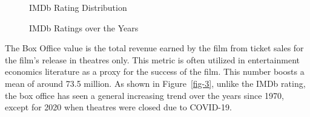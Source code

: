 \documentclass[
]{agujournal2019}
\begin{document}
\begin{figure}


\caption{\label{fig-1}IMDb Rating Distribution}

\end{figure}%

\begin{figure}


\caption{\label{fig-2}IMDb Ratings over the Years}

\end{figure}%

The Box Office value is the total revenue earned by the film from ticket
sales for the film's release in theatres only. This metric is often
utilized in entertainment economics literature as a proxy for the
success of the film. This number boosts a mean of around 73.5 million.
As shown in Figure~\ref{fig-3}, unlike the IMDb rating, the box office
has seen a general increasing trend over the years since 1970, except
for 2020 when theatres were closed due to COVID-19.
\end{document}
